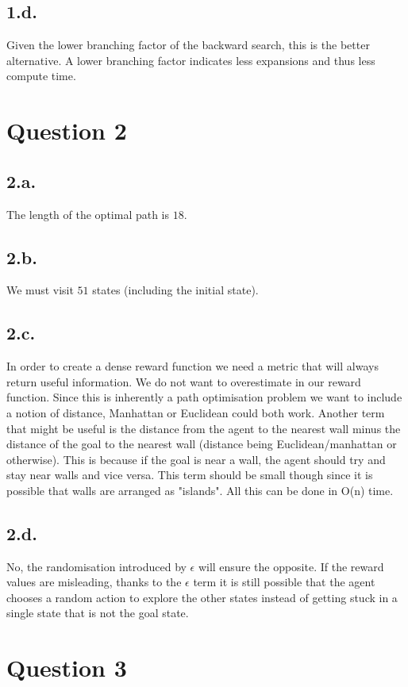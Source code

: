\documentclass{article}
\begin{document}
\subsection*{1.d.}
Given the lower branching factor of the backward search, this is the better
alternative. A lower branching factor indicates less expansions and thus
less compute time.

\section*{Question 2}
\subsection*{2.a.}
The length of the optimal path is $18$.

\subsection*{2.b.}
We must visit $51$ states (including the initial state).

\subsection*{2.c.}
In order to create a dense reward function we need a metric that
will always return useful information. We do not want to overestimate
in our reward function. Since this is inherently a path optimisation
problem we want to include a notion of distance, Manhattan or
Euclidean could both work. Another term that might be useful is
the distance from the agent to the nearest wall minus the distance
of the goal to the nearest wall (distance being Euclidean/manhattan
or otherwise). This is because if the goal is near a wall, the agent
should try and stay near walls and vice versa. This term should be
small though since it is possible that walls are arranged as
"islands". All this can be done in O(n) time.

\subsection*{2.d.}
No, the randomisation introduced by $\epsilon$ will ensure the opposite.
If the reward values are misleading, thanks to the $\epsilon$ term
it is still possible that the agent chooses a random action to
explore the other states instead of getting stuck in a single state
that is not the goal state.

\section*{Question 3}
\end{document}
